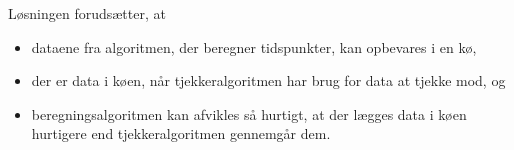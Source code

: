 
Løsningen forudsætter, at
\begin{itemize}
\item dataene fra algoritmen, der beregner tidspunkter, kan opbevares
  i en kø,
\item der er data i køen, når tjekkeralgoritmen har brug for data at
  tjekke mod, og
\item beregningsalgoritmen kan afvikles så hurtigt, at der lægges data
  i køen hurtigere end tjekkeralgoritmen gennemgår dem.
\end{itemize}


